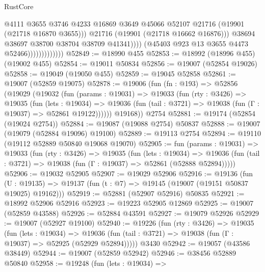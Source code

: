 \begin{lexlean}{RustCore}
\begin{coremodule}
                                        @4111
                                        @3655
                                        @3746
                                        @4233
                                        @16869
                                        @3649
                                        @45066
                                        @52107
                                        @21716
                                        (@19901 (@21718 @16870 @3655)))
                                      @21716
                                      (@19901 (@21718 @16662 @16876)))
                                    @38694
                                    @38697
                                    @38700
                                    @38704
                                    @38709
                                    @41341))))
                            (@45403 @923 @13 @3655 @4473 @52466)))))))))))))
@52849 := @18990 @455
@52853 := @18992 (@18996 @455) (@19002 @455)
@52854 := @19011 @50834
@52856 := @19007 (@52854 @19026)
@52858 := @19049 (@19050 @455)
@52859 := @19045 @52858
@52861 := @19007 (@52859 @19075)
@52878 := @19006
    (fun (fn : @193) =>
    @52856
      (@19029
        (@19032
          (fun (params : @19031) =>
          @19033
            (fun (rty : @3426) =>
            @19035
              (fun (lets : @19034) =>
              @19036 (fun (tail : @3721) => @19038 (fun (Γ : @19037) => @52861 @19122))))))
        @19168))
    @2754
@52881 := @19174 (@52854 (@19024 @2754))
@52884 := @19087 (@19088 @2754) @50837
@52888 := @19007 (@19079 (@52884 @19096) @19100)
@52889 := @19113 @2754
@52894 := @19110 (@19112 @52889 @50840 @19068 @19070)
@52905 := fun (params : @19031) =>
  @19033
    (fun (rty : @3426) =>
    @19035
      (fun (lets : @19034) =>
      @19036 (fun (tail : @3721) => @19038 (fun (Γ : @19037) => @52861 (@52888 @52894)))))
@52906 := @19032 @52905
@52907 := @19029 @52906
@52916 := @19136
    (fun (U : @19135) => @19137 (fun (t : @7) => @19145 (@19007 (@19151 @50837 @19025) @19162)))
@52919 := @52881 (@52907 @52916) @50835
@52921 := @18992 @52906 @52916
@52923 := @19223 @52905 @12869
@52925 := @19007 (@52859 @43588)
@52926 := @52884 @43591
@52927 := @19079 @52926
@52929 := @19007 (@52927 @19100)
@52940 := @19226
    (fun (rty : @3426) =>
    @19035
      (fun (lets : @19034) =>
      @19036 (fun (tail : @3721) => @19038 (fun (Γ : @19037) => @52925 (@52929 @52894)))))
    @3430
@52942 := @19057 (@43586 @38449)
@52944 := @19007 (@52859 @52942)
@52946 := @38456 @52889 @50840
@52958 := @19248
    (fun (lets : @19034) =>

\end{coremodule}
\end{lexlean}
